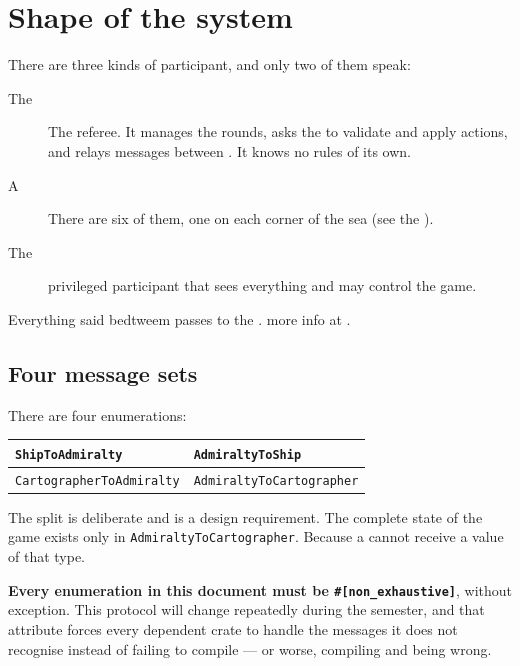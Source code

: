 \documentclass{article}
\begin{document}
\tableofcontents
\newpage

\section{Shape of the system}
\label{proto:shape}

There are three kinds of participant, and only two of them speak:

\begin{description}
    \item[The \admiralty] The referee. It manages the rounds, asks the \chart{} to validate and apply actions, and relays messages
      between \ships. It knows no rules of its own.
    \item[A \ship] There are six of them, one on each corner of the sea (see the \MD).
    \item[The \cartographer] privileged participant that sees everything and may control the
      game.
\end{description}

Everything said bedtweem \ships passes to the \admiralty. more info at .

\subsection{Four message sets}
\label{proto:foursets}

There are four enumerations:

\begin{center}
\begin{tabular}{|l|l|}
 \hline
 \texttt{ShipToAdmiralty} & \texttt{AdmiraltyToShip} \\
 \hline
 \texttt{CartographerToAdmiralty} & \texttt{AdmiraltyToCartographer} \\
 \hline
\end{tabular}
\end{center}

The split is deliberate and is a design requirement. The complete state of the game
exists only in \texttt{AdmiraltyToCartographer}. Because a \ship{} cannot receive a value of that
type.

\textbf{Every enumeration in this document must be \texttt{\#[non\_exhaustive]}}, without
exception. This protocol will change repeatedly during
the semester, and that attribute forces every dependent crate to handle the messages it does not
recognise instead of failing to compile --- or worse, compiling and being wrong.
\end{document}
